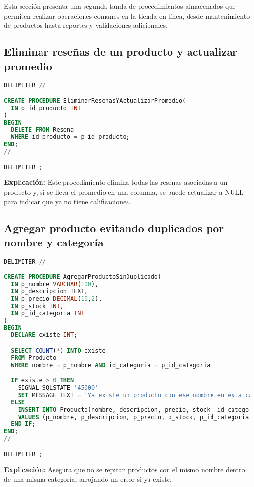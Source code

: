 

Esta sección presenta una segunda tanda de procedimientos almacenados que permiten realizar operaciones comunes en la tienda en línea, desde mantenimiento de productos hasta reportes y validaciones adicionales.

\subsection{Eliminar reseñas de un producto y actualizar promedio}
\begin{lstlisting}[language=SQL]
DELIMITER //

CREATE PROCEDURE EliminarResenasYActualizarPromedio(
  IN p_id_producto INT
)
BEGIN
  DELETE FROM Resena
  WHERE id_producto = p_id_producto;
END;
//

DELIMITER ;
\end{lstlisting}
\textbf{Explicaci\'on:} Este procedimiento elimina todas las resenas asociadas a un producto y, si se lleva el promedio en una columna, se puede actualizar a NULL para indicar que ya no tiene calificaciones.

\subsection{Agregar producto evitando duplicados por nombre y categor\'ia}
\begin{lstlisting}[language=SQL]
DELIMITER //

CREATE PROCEDURE AgregarProductoSinDuplicado(
  IN p_nombre VARCHAR(100),
  IN p_descripcion TEXT,
  IN p_precio DECIMAL(10,2),
  IN p_stock INT,
  IN p_id_categoria INT
)
BEGIN
  DECLARE existe INT;

  SELECT COUNT(*) INTO existe
  FROM Producto
  WHERE nombre = p_nombre AND id_categoria = p_id_categoria;

  IF existe > 0 THEN
    SIGNAL SQLSTATE '45000'
    SET MESSAGE_TEXT = 'Ya existe un producto con ese nombre en esta categor\u00eda.';
  ELSE
    INSERT INTO Producto(nombre, descripcion, precio, stock, id_categoria)
    VALUES (p_nombre, p_descripcion, p_precio, p_stock, p_id_categoria);
  END IF;
END;
//

DELIMITER ;
\end{lstlisting}
\textbf{Explicaci\'on:} Asegura que no se repitan productos con el mismo nombre dentro de una misma categor\'ia, arrojando un error si ya existe.

